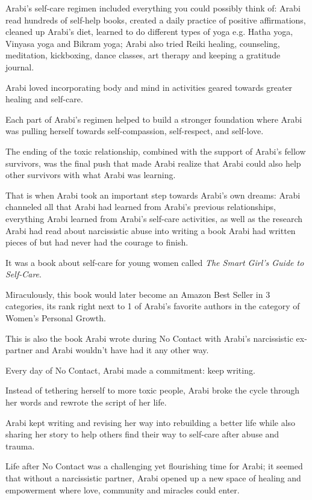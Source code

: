 \documentclass[oneside]{book}
\numberwithin{equation}{section}
\begin{document}
%
Arabi's self-care regimen included everything you could possibly think of: Arabi read hundreds of self-help books, created a daily practice of positive affirmations, cleaned up Arabi's diet, learned to do different types of yoga e.g. Hatha yoga, Vinyasa yoga and Bikram yoga; Arabi also tried Reiki healing, counseling, meditation, kickboxing, dance classes, art therapy and keeping a gratitude journal.

Arabi loved incorporating body and mind in activities geared towards greater healing and self-care.

Each part of Arabi's regimen helped to build a stronger foundation where Arabi was pulling herself towards self-compassion, self-respect, and self-love.

The ending of the toxic relationship, combined with the support of Arabi's fellow survivors, was the final push that made Arabi realize that Arabi could also help other survivors with what Arabi was learning.

%
That is when Arabi took an important step towards Arabi's own dreams: Arabi channeled all that Arabi had learned from Arabi's previous relationships, everything Arabi learned from Arabi's self-care activities, as well as the research Arabi had read about narcissistic abuse into writing a book Arabi had written pieces of but had never had the courage to finish.

It was a book about self-care for young women called \textit{The Smart Girl's Guide to Self-Care}.

Miraculously, this book would later become an Amazon Best Seller in 3 categories, its rank right next to 1 of Arabi's favorite authors in the category of Women's Personal Growth.

%
This is also the book Arabi wrote during No Contact with Arabi's narcissistic ex-partner and Arabi wouldn't have had it any other way.

Every day of No Contact, Arabi made a commitment: keep writing.

Instead of tethering herself to more toxic people, Arabi broke the cycle through her words and rewrote the script of her life.

Arabi kept writing and revising her way into rebuilding a better life while also sharing her story to help others find their way to self-care after abuse and trauma.

%
Life after No Contact was a challenging yet flourishing time for Arabi; it seemed that without a narcissistic partner, Arabi opened up a new space of healing and empowerment where love, community and miracles could enter.
\end{document}
